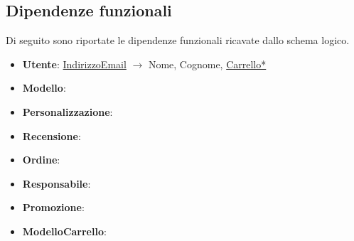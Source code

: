 \subsection{Dipendenze funzionali}
Di seguito sono riportate le dipendenze funzionali ricavate dallo schema logico.

\begin{itemize}
	\item \textbf{Utente}: \underline{IndirizzoEmail} $\rightarrow$ Nome, Cognome,
	      \underline{Carrello*}
	\item \textbf{Modello}:
	\item \textbf{Personalizzazione}:
	\item \textbf{Recensione}:
	\item \textbf{Ordine}:
	\item \textbf{Responsabile}:
	\item \textbf{Promozione}:
	\item \textbf{ModelloCarrello}:
\end{itemize}